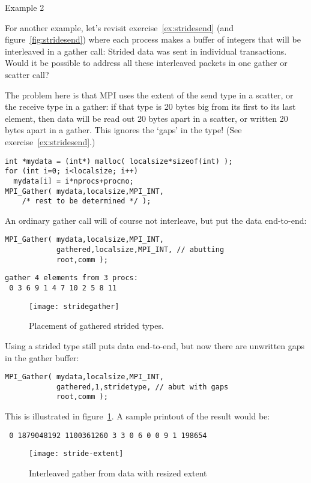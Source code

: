  {Example 2}
\label{sec:extent-ex2}

For another example, let's revisit exercise~\ref{ex:stridesend}
(and  figure~\ref{fig:stridesend})
where each process makes a
buffer of integers that will be interleaved in a gather call:
Strided data was sent in individual transactions.
Would it be possible to address all these interleaved packets in one
gather or scatter call?

The problem here is that MPI uses the extent of the send type in a scatter,
or the receive type in a gather: if that type is 20 bytes big from
its first to its last element, then
data will be read out 20 bytes apart in a scatter, or written 20 bytes apart
in a gather. This ignores the `gaps' in the type!
(See exercise~\ref{ex:stridesend}.)

\begin{lstlisting}
int *mydata = (int*) malloc( localsize*sizeof(int) );
for (int i=0; i<localsize; i++)
  mydata[i] = i*nprocs+procno;
MPI_Gather( mydata,localsize,MPI_INT,
    /* rest to be determined */ );
\end{lstlisting}

An ordinary gather call will of course not interleave, but
put the data end-to-end:
\begin{lstlisting}
MPI_Gather( mydata,localsize,MPI_INT,
            gathered,localsize,MPI_INT, // abutting
            root,comm );
\end{lstlisting}
\begin{verbatim}
gather 4 elements from 3 procs:
 0 3 6 9 1 4 7 10 2 5 8 11
\end{verbatim}

\begin{figure}
  \texttt{[image: stridegather]}
  \caption{Placement of gathered strided types.}
  \label{fig:stridegather}
\end{figure}
Using a strided type still puts data end-to-end, but now there
are unwritten gaps in the gather buffer:
\begin{lstlisting}
MPI_Gather( mydata,localsize,MPI_INT,
            gathered,1,stridetype, // abut with gaps
            root,comm );  
\end{lstlisting}
This is illustrated in figure~\ref{fig:stridegather}.
A sample printout of the result would be:
\begin{verbatim}
 0 1879048192 1100361260 3 3 0 6 0 0 9 1 198654
\end{verbatim}

\begin{figure}[ht]
  \texttt{[image: stride-extent]}
  \caption{Interleaved gather from data with resized extent}
  \label{fig:stride-extent}
\end{figure}

